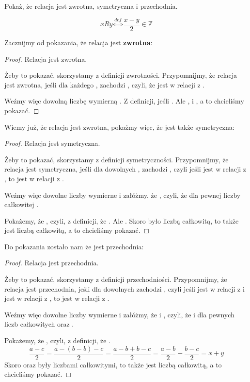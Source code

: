 \begin{example}
Pokaż, że relacja  jest zwrotna, symetryczna i przechodnia.

\[
 xRy \stackrel{def}{\Longleftrightarrow} \frac{x-y}{2} \in \mathbb{Z}
\]

Zacznijmy od pokazania, że relacja  jest \textbf{zwrotna}:

\begin{proof}
Relacja  jest zwrotna.

Żeby to pokazać, skorzystamy z definicji zwrotności. Przypomnijmy, że relacja jest zwrotna, jeśli dla każdego , zachodzi , czyli, że  jest w relacji z .

Weźmy więc dowolną liczbę wymierną . Z definicji,  jeśli . Ale , i , a to chcieliśmy pokazać.
\end{proof}

Wiemy już, że relacja jest zwrotna, pokażmy więc, że jest także symetryczna:

\begin{proof}
Relacja  jest symetryczna.

Żeby to pokazać, skorzystamy z definicji symetryczności. Przypomnijmy, że relacja jest symetryczna, jeśli dla dowolnych , zachodzi , czyli jeśli  jest w relacji z , to  jest w relacji z .

Weźmy więc dowolne liczby wymierne  i załóżmy, że , czyli, że  dla pewnej liczby całkowitej . 

Pokażemy, że , czyli, z definicji, że . Ale . Skoro  było liczbą całkowitą, to  także jest liczbą całkowitą, a to chcieliśmy pokazać.
\end{proof}

Do pokazania zostało nam że  jest przechodnia:

\begin{proof}
Relacja  jest przechodnia.

Żeby to pokazać, skorzystamy z definicji przechodniości. Przypomnijmy, że relacja jest przechodnia, jeśli dla dowolnych  zachodzi , czyli jeśli  jest w relacji z  i  jest w relacji z , to  jest w relacji z .

Weźmy więc dowolne liczby wymierne  i załóżmy, że  i , czyli, że  i  dla pewnych liczb całkowitych  oraz .

Pokażemy, że , czyli, z definicji, że . 
\[
 \frac{a-c}{2} = \frac{a-(b-b)-c}{2} = \frac{a-b+b-c}{2} = \frac{a-b}{2} + \frac{b-c}{2} = x + y
\]
Skoro  oraz  były liczbami całkowitymi, to  także jest liczbą całkowitą, a to chcieliśmy pokazać.
\end{proof}
\end{example}


